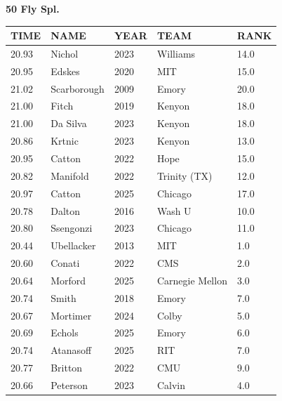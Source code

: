 \begin{table}[H]
\centering
\begin{minipage}[t]{0.6\textwidth}
\centering
\textbf{50 Fly Spl.}\\[0.1cm]
\begin{tabular}{@{}p{1.8cm}p{2.8cm}p{1.2cm}p{1.4cm}p{0.8cm}@{}}
\hline
    \textbf{TIME} & \textbf{NAME} & \textbf{YEAR} & \textbf{TEAM} & \textbf{RANK} \\
\hline
    20.93 & Nichol & 2023 & Williams & 14.0 \\
    20.95 & Edskes & 2020 & MIT & 15.0 \\
    21.02 & Scarborough & 2009 & Emory & 20.0 \\
    21.00 & Fitch & 2019 & Kenyon & 18.0 \\
    21.00 & Da Silva & 2023 & Kenyon & 18.0 \\
    20.86 & Krtnic & 2023 & Kenyon & 13.0 \\
    20.95 & Catton & 2022 & Hope & 15.0 \\
    20.82 & Manifold & 2022 & Trinity (TX) & 12.0 \\
    20.97 & Catton & 2025 & Chicago & 17.0 \\
    20.78 & Dalton & 2016 & Wash U & 10.0 \\
    20.80 & Ssengonzi & 2023 & Chicago & 11.0 \\
    20.44 & Ubellacker & 2013 & MIT & 1.0 \\
    20.60 & Conati & 2022 & CMS & 2.0 \\
    20.64 & Morford & 2025 & Carnegie Mellon & 3.0 \\
    20.74 & Smith & 2018 & Emory & 7.0 \\
    20.67 & Mortimer & 2024 & Colby & 5.0 \\
    20.69 & Echols & 2025 & Emory & 6.0 \\
    20.74 & Atanasoff & 2025 & RIT & 7.0 \\
    20.77 & Britton & 2022 & CMU & 9.0 \\
    20.66 & Peterson & 2023 & Calvin & 4.0 \\
\hline
\end{tabular}
\end{minipage}
\end{table}

